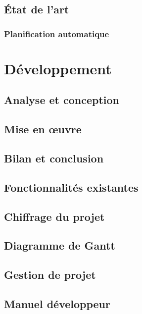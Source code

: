\documentclass{polytech/polytech}
\begin{document}
\chapter{État de l'art}


\section{Planification automatique}


\part{Développement}


\chapter{Analyse et conception}


\chapter{Mise en œuvre}


\chapter{Bilan et conclusion}


\appendix

\chapter{Fonctionnalités existantes}

\chapter{Chiffrage du projet}


\chapter{Diagramme de Gantt}

\chapter{Gestion de projet}

\chapter{Manuel développeur}


\end{document}
